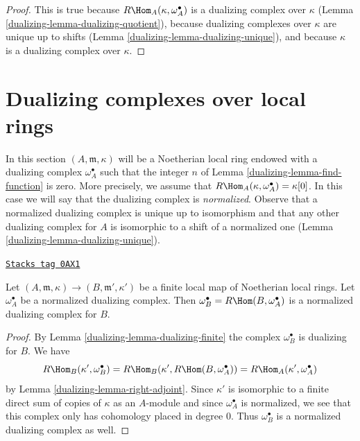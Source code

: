 \begin{proof}

This is true because $R\Hom_A(\kappa, \omega_A^\bullet)$ is a dualizing
complex over $\kappa$ (Lemma \ref{dualizing-lemma-dualizing-quotient}),
because dualizing complexes over $\kappa$ are unique up to shifts
(Lemma \ref{dualizing-lemma-dualizing-unique}), and because $\kappa$ is a
dualizing complex over $\kappa$.
\end{proof}

\section{Dualizing complexes over local rings}
\label{dualizing-section-dualizing-local}
In this section $(A, \mathfrak m, \kappa)$ will be a Noetherian local
ring endowed with a dualizing complex $\omega_A^\bullet$ such that
the integer $n$ of Lemma \ref{dualizing-lemma-find-function} is zero.
More precisely, we assume that $R\Hom_A(\kappa, \omega_A^\bullet) = \kappa[0]$.
In this case we will say that the dualizing complex is {\it normalized}.
Observe that a normalized dualizing complex is unique up to
isomorphism and that any other dualizing complex for $A$ is isomorphic
to a shift of a normalized one (Lemma \ref{dualizing-lemma-dualizing-unique}).

\begin{lemma}
\label{dualizing-lemma-normalized-finite}
\href{https://stacks.math.columbia.edu/tag/0AX1}{\texttt{Stacks tag 0AX1}}

Let $(A, \mathfrak m, \kappa) \to (B, \mathfrak m', \kappa')$
be a finite local map of Noetherian local rings. Let $\omega_A^\bullet$
be a normalized dualizing complex. Then
$\omega_B^\bullet = R\Hom(B, \omega_A^\bullet)$ is a
normalized dualizing complex for $B$.
\end{lemma}

\begin{proof}

By Lemma \ref{dualizing-lemma-dualizing-finite} the complex
$\omega_B^\bullet$ is dualizing for $B$. We have
$$
R\Hom_B(\kappa', \omega_B^\bullet) =
R\Hom_B(\kappa', R\Hom(B, \omega_A^\bullet)) =
R\Hom_A(\kappa', \omega_A^\bullet)
$$
by Lemma \ref{dualizing-lemma-right-adjoint}. Since $\kappa'$ is isomorphic
to a finite direct sum of copies of $\kappa$ as an $A$-module
and since $\omega_A^\bullet$ is normalized, we
see that this complex only has cohomology placed in degree $0$.
Thus $\omega_B^\bullet$ is a normalized dualizing complex as well.
\end{proof}

